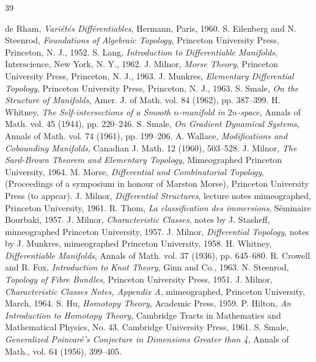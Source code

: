 \cleardoublepage
\begin{thebibliography}{39}
 de Rham, \emph{Vari\'et\'es Diff\'erentiables}, Hermann, Paris, 1960.
 S. Eilenberg and N. Steenrod, \emph{Foundations of Algebraic Topology}, Princeton University Press, Princeton, N. J., 1952.
 S. Lang, \emph{Introduction to Differentiable Manifolds}, Interscience, New York, N. Y., 1962.
 J. Milnor, \emph{Morse Theory}, Princeton University Press, Princeton, N. J., 1963.
 J. Munkres, \emph{Elementary Differential Topology}, Princeton University Press, Princeton, N. J., 1963.
 S. Smale, \emph{On the Structure of Manifolds}, Amer. J. of Math. vol. 84 (1962), pp. 387--399.
 H. Whitney, \emph{The Self-intersections of a Smooth $n$-manifold in $2n$-space}, Annals of Math. vol. 45 (1944), pp. 220--246.
 S. Smale, \emph{On Gradient Dynamical Systems}, Annals of Math. vol. 74 (1961), pp. 199--206.
 A. Wallace, \emph{Modifications and Cobounding Manifolds}, Canadian J. Math. 12 (1960), 503--528.
 J. Milnor, \emph{The Sard-Brown Theorem and Elementary Topology}, Mimeographed Princeton University, 1964.
 M. Morse, \emph{Differential and Combinatorial Topology}, (Proceedings of a symposium in honour of Marston Morse), Princeton University Press (to appear).
 J. Milnor, \emph{Differential Structures}, lecture notes mimeographed, Princeton University, 1961.
 R. Thom, \emph{La classification des immersions}, S\'eminaire Bourbaki, 1957.
 J. Milnor, \emph{Characteristic Classes}, notes by J. Stasheff, mimeographed Princeton University, 1957.
 J. Milnor, \emph{Differential Topology}, notes by J. Munkres, mimeographed Princeton University, 1958.
 H. Whitney, \emph{Differentiable Manifolds}, Annals of Math. vol. 37 (1936), pp. 645--680.
 R. Crowell and R. Fox, \emph{Introduction to Knot Theory}, Ginn and Co., 1963.
 N. Steenrod, \emph{Topology of Fibre Bundles}, Princeton University Press, 1951.
 J. Milnor, \emph{Characteristic Classes Notes, Appendix A}, mimeographed, Princeton University, March, 1964.
 S. Hu, \emph{Homotopy Theory}, Academic Press, 1959.
 P. Hilton, \emph{An Introduction to Homotopy Theory}, Cambridge Tracts in Mathematics and Mathematical Physics, No. 43, Cambridge University Press, 1961.
 S. Smale, \emph{Generalized Poincar\'e's Conjecture in Dimensions Greater than 4}, Annals of Math., vol. 64 (1956), 399--405.

\end{thebibliography}
